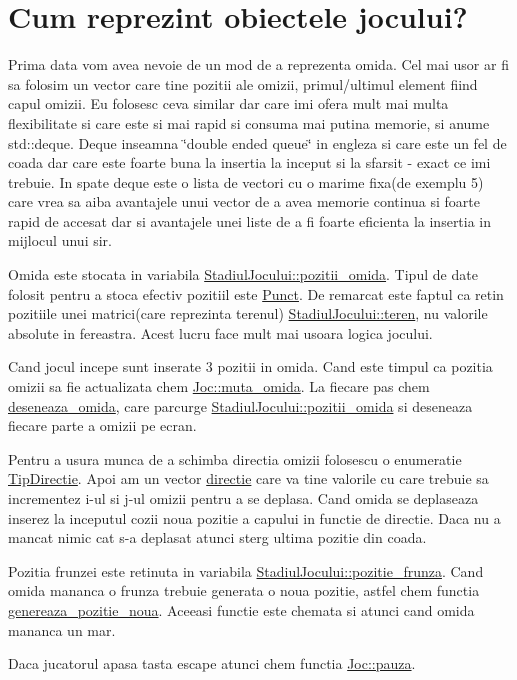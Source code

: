 \hypertarget{group__group__cum__reprezint__obiectele}{}\section{Cum reprezint obiectele jocului?}
\label{group__group__cum__reprezint__obiectele}
Prima data vom avea nevoie de un mod de a reprezenta omida. Cel mai usor ar fi sa folosim un vector care tine pozitii ale omizii, primul/ultimul element fiind capul omizii. Eu folosesc ceva similar dar care imi ofera mult mai multa flexibilitate si care este si mai rapid si consuma mai putina memorie, si anume std\+::deque. Deque inseamna \char`\"{}double ended queue\char`\"{} in engleza si care este un fel de coada dar care este foarte buna la insertia la inceput si la sfarsit -\/ exact ce imi trebuie. In spate deque este o lista de vectori cu o marime fixa(de exemplu 5) care vrea sa aiba avantajele unui vector de a avea memorie continua si foarte rapid de accesat dar si avantajele unei liste de a fi foarte eficienta la insertia in mijlocul unui sir.

Omida este stocata in variabila \hyperlink{classStadiulJocului_a64e0608d9c68b22ea83fd5aba209453f}{Stadiul\+Jocului\+::pozitii\+\_\+omida}. Tipul de date folosit pentru a stoca efectiv pozitiil este \hyperlink{structPunct}{Punct}. De remarcat este faptul ca retin pozitiile unei matrici(care reprezinta terenul) \hyperlink{classStadiulJocului_a2e71823589e83f16593f8a2870c065e6}{Stadiul\+Jocului\+::teren}, nu valorile absolute in fereastra. Acest lucru face mult mai usoara logica jocului.

Cand jocul incepe sunt inserate 3 pozitii in omida. Cand este timpul ca pozitia omizii sa fie actualizata chem \hyperlink{classJoc_afd69d2cd19f6d2ac2b1a42a4685349e6}{Joc\+::muta\+\_\+omida}. La fiecare pas chem \hyperlink{main_8cpp_aa57c630272aa6ab8ab15552adf8c165e}{deseneaza\+\_\+omida}, care parcurge \hyperlink{classStadiulJocului_a64e0608d9c68b22ea83fd5aba209453f}{Stadiul\+Jocului\+::pozitii\+\_\+omida} si deseneaza fiecare parte a omizii pe ecran.

Pentru a usura munca de a schimba directia omizii folosescu o enumeratie \hyperlink{main_8cpp_aea66a0d525bf9bfb9b61e9cc1ba0b752}{Tip\+Directie}. Apoi am un vector \hyperlink{main_8cpp_a68e903f0d20f0a68b3c01b73eb34e9ed}{directie} care va tine valorile cu care trebuie sa incrementez i-\/ul si j-\/ul omizii pentru a se deplasa. Cand omida se deplaseaza inserez la inceputul cozii noua pozitie a capului in functie de directie. Daca nu a mancat nimic cat s-\/a deplasat atunci sterg ultima pozitie din coada.

Pozitia frunzei este retinuta in variabila \hyperlink{classStadiulJocului_a141067404f3678036ee7a91a02532a30}{Stadiul\+Jocului\+::pozitie\+\_\+frunza}. Cand omida mananca o frunza trebuie generata o noua pozitie, astfel chem functia \hyperlink{main_8cpp_a5f6f5f86af147286478cc7aadd76b0a2}{genereaza\+\_\+pozitie\+\_\+noua}. Aceeasi functie este chemata si atunci cand omida mananca un mar.

Daca jucatorul apasa tasta escape atunci chem functia \hyperlink{classJoc_a0f90008558e8cbed6537b542f79ae55b}{Joc\+::pauza}. 
